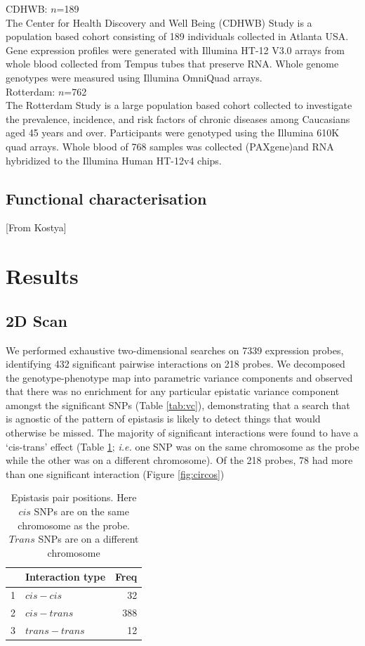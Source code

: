 \documentclass[paper=a4, fontsize=11pt]{scrartcl}	%
\numberwithin{equation}{section}									%
\numberwithin{figure}{section}										%
\numberwithin{table}{section}										%
\begin{document}
CDHWB: $n$=189 \\ [0.1cm]
The Center for Health Discovery and Well Being (CDHWB) Study is a population based cohort consisting of 189 individuals collected in Atlanta USA. Gene expression profiles were generated with Illumina HT-12 V3.0 arrays from whole blood collected from Tempus tubes that preserve RNA. Whole genome genotypes were measured using Illumina OmniQuad arrays. \\[0.1cm]

Rotterdam: $n$=762 \\[0.1cm]
The Rotterdam Study is a large population based cohort collected to investigate the prevalence, incidence, and risk factors of chronic diseases among  Caucasians aged 45 years and over. Participants were genotyped using the Illumina 610K quad arrays. Whole blood of 768 samples was collected (PAXgene)and RNA hybridized to the Illumina Human HT-12v4 chips.

\subsection{Functional characterisation}

[From Kostya]

\section{Results}

\subsection{2D Scan}

We performed exhaustive two-dimensional searches on 7339 expression probes, identifying 432 significant pairwise interactions on 218 probes. We decomposed the genotype-phenotype map into parametric variance components and observed that there was no enrichment for any particular epistatic variance component amongst the significant SNPs (Table \ref{tab:vc}), demonstrating that a search that is agnostic of the pattern of epistasis is likely to detect things that would otherwise be missed. The majority of significant interactions were found to have a `cis-trans' effect (Table \ref{tab:type}; \emph{i.e.} one SNP was on the same chromosome as the probe while the other was on a different chromosome). Of the 218 probes, 78 had more than one significant interaction (Figure \ref{fig:circos})


\begin{table}[ht]
	\centering
	\begin{tabular}{rlr}
		\hline
		& Interaction type & Freq \\ 
		\hline
		1 & $cis-cis$ &  32 \\ 
		2 & $cis-trans$ & 388 \\ 
		3 & $trans-trans$ &  12 \\ 
		\hline
	\end{tabular}
	\caption{Epistasis pair positions. Here $cis$ SNPs are on the same chromosome as the probe. $Trans$ SNPs are on a different chromosome}
	\label{tab:type}
\end{table}
\end{document}

